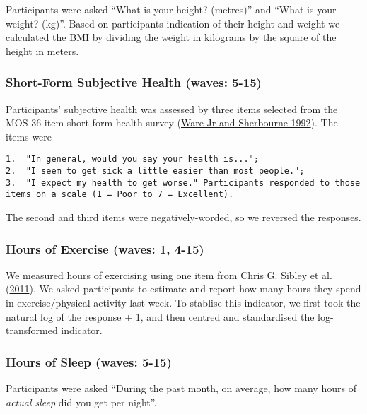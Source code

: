 \documentclass[
  singlecolumn]{report}
\begin{document}
Participants were asked ``What is your height? (metres)'' and ``What is
your weight? (kg)''. Based on participants indication of their height
and weight we calculated the BMI by dividing the weight in kilograms by
the square of the height in meters.

\hypertarget{short-form-subjective-health-waves-5-15}{%
\subsubsection{Short-Form Subjective Health (waves:
5-15)}\label{short-form-subjective-health-waves-5-15}}

Participants' subjective health was assessed by three items selected
from the MOS 36-item short-form health survey
(\protect\hyperlink{ref-warejr1992}{Ware Jr and Sherbourne 1992}). The
items were

\begin{verbatim}
1.  "In general, would you say your health is...";
2.  "I seem to get sick a little easier than most people.";
3.  "I expect my health to get worse." Participants responded to those items on a scale (1 = Poor to 7 = Excellent).
\end{verbatim}

The second and third items were negatively-worded, so we reversed the
responses.

\hypertarget{hours-of-exercise-waves-1-4-15}{%
\subsubsection{Hours of Exercise (waves: 1,
4-15)}\label{hours-of-exercise-waves-1-4-15}}

We measured hours of exercising using one item from Chris G. Sibley et
al. (\protect\hyperlink{ref-sibley2011}{2011}). We asked participants to
estimate and report how many hours they spend in exercise/physical
activity last week. To stablise this indicator, we first took the
natural log of the response + 1, and then centred and standardised the
log-transformed indicator.

\hypertarget{hours-of-sleep-waves-5-15}{%
\subsubsection{Hours of Sleep (waves:
5-15)}\label{hours-of-sleep-waves-5-15}}

Participants were asked ``During the past month, on average, how many
hours of \emph{actual sleep} did you get per night''.
\end{document}
